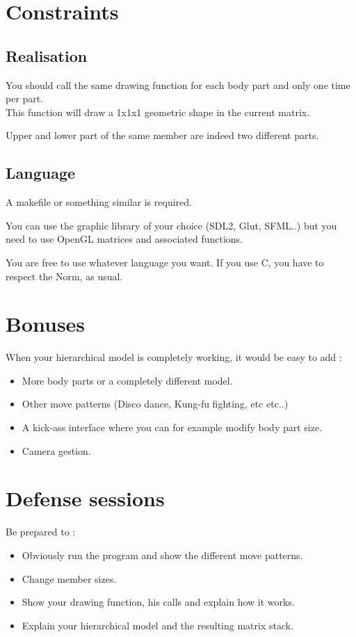 \documentclass{42}
\begin{document}
\section{Constraints}

\subsection{Realisation}
You should call the same drawing function for each body part and only one time per part.\\
This function will draw a 1x1x1 geometric shape in the current matrix.

\info
{
	Upper and lower part of the same member are indeed two different parts.
}

\subsection{Language}

A makefile or something similar is required.

You can use the graphic library of your choice (SDL2, Glut, SFML..) but you need to use OpenGL matrices and associated functions.

You are free to use whatever language you want. If you use C, you have to respect the Norm, as usual.

\section{Bonuses}

When your hierarchical model is completely working, it would be easy to add :
\begin{itemize}
	\item More body parts or a completely different model.
	\item Other move patterns (Disco dance, Kung-fu fighting, etc etc..)
	\item A kick-ass interface where you can for example modify body part size.
	\item Camera gestion.
\end{itemize}

\section{Defense sessions}

Be prepared to :
\begin{itemize}
	\item Obviously run the program and show the different move patterns.
	\item Change member sizes.
	\item Show your drawing function, his calls and explain how it works.
	\item Explain your hierarchical model and the resulting matrix stack.
\end{itemize}
\end{document}
